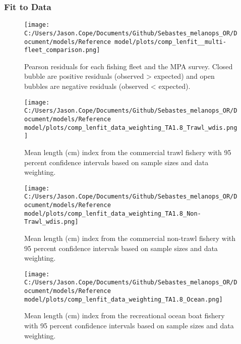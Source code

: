 \documentclass[11pt,
  english,
  letterpaper,
]{article}
\begin{document}
\clearpage

\hypertarget{fit-to-data}{%
\subsubsection{Fit to Data}\label{fit-to-data}}

\begin{figure}
\centering
\texttt{[image: C:/Users/Jason.Cope/Documents/Github/Sebastes\_melanops\_OR/Document/models/Reference model/plots/comp\_lenfit\_\_multi-fleet\_comparison.png]}
\caption{Pearson residuals for each fishing fleet and the MPA survey. Closed bubble are positive residuals (observed \textgreater{} expected) and open bubbles are negative residuals (observed \textless{} expected).\label{fig:lt-pearson-resids}}
\end{figure}

\newpage

\begin{figure}
\centering
\texttt{[image: C:/Users/Jason.Cope/Documents/Github/Sebastes\_melanops\_OR/Document/models/Reference model/plots/comp\_lenfit\_data\_weighting\_TA1.8\_Trawl\_wdis.png]}
\caption{Mean length (cm) index from the commercial trawl fishery with 95 percent confidence intervals based on sample sizes and data weighting.\label{fig:trawl-mean-len-fit}}
\end{figure}

\newpage

\begin{figure}
\centering
\texttt{[image: C:/Users/Jason.Cope/Documents/Github/Sebastes\_melanops\_OR/Document/models/Reference model/plots/comp\_lenfit\_data\_weighting\_TA1.8\_Non-Trawl\_wdis.png]}
\caption{Mean length (cm) index from the commercial non-trawl fishery with 95 percent confidence intervals based on sample sizes and data weighting.\label{fig:nontrawl-mean-len-fit}}
\end{figure}

\newpage

\begin{figure}
\centering
\texttt{[image: C:/Users/Jason.Cope/Documents/Github/Sebastes\_melanops\_OR/Document/models/Reference model/plots/comp\_lenfit\_data\_weighting\_TA1.8\_Ocean.png]}
\caption{Mean length (cm) index from the recreational ocean boat fishery with 95 percent confidence intervals based on sample sizes and data weighting.\label{fig:ocean-mean-len-fit}}
\end{figure}
\end{document}
